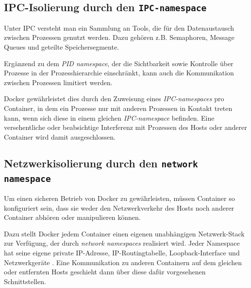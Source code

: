 \documentclass[../main.tex]{subfiles}
\begin{document}


    \subsection{\acrshort{IPC}-Isolierung durch den \texttt{\acrshort{IPC}-namespace}}
			Unter \acrshort{IPC} versteht man ein Sammlung an Tools, die für den Datenaustausch zwischen Prozessen genutzt werden. Dazu gehören z.B. Semaphoren, Message Queues und geteilte Speichersegmente.

			Ergänzend zu dem \emph{\acrshort{PID} namespace}, der die Sichtbarkeit sowie Kontrolle über Prozesse in der Prozesshierarchie einschränkt, kann auch die Kommunikation zwischen Prozessen limitiert werden.

			Docker gewährleistet dies durch den Zuweisung eines \emph{\acrshort{IPC}-namespaces} pro Container, in dem ein Prozesse nur mit anderen Prozessen in Kontakt treten kann, wenn sich diese in einem gleichen \emph{\acrshort{IPC}-namespace} befinden. Eine versehentliche oder beabsichtige Interferenz mit Prozessen des Hosts oder anderer Container wird damit ausgeschlossen.



    \subsection{Netzwerkisolierung durch den \texttt{network namespace}}
			Um einen sicheren Betrieb von Docker zu gewährleisten, müssen Container so konfiguriert sein, dass sie weder den Netzwerkverkehr des Hosts noch anderer Container abhören oder manipulieren können.

			Dazu stellt Docker jedem Container einen eigenen unabhängigen Netzwerk-Stack zur Verfügung, der durch \emph{network namespaces} realisiert wird. Jeder Namespace hat seine eigene private IP-Adresse, IP-Routingtabelle, Loopback-Interface und Netzwerkgeräte \cite[S.2+3]{virtVSContainer}. Eine Kommunikation zu anderen Containern auf dem gleichen oder entfernten Hosts geschieht dann über diese dafür vorgesehenen Schnittstellen.
\end{document}
